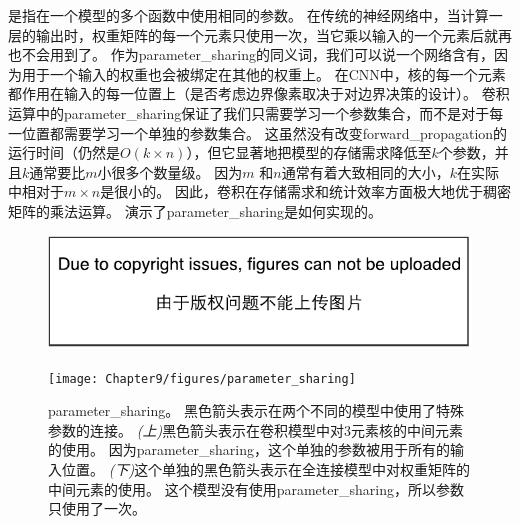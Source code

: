 是指在一个模型的多个函数中使用相同的参数。
在传统的神经网络中，当计算一层的输出时，权重矩阵的每一个元素只使用一次，当它乘以输入的一个元素后就再也不会用到了。
作为\gls{parameter_sharing}的同义词，我们可以说一个网络含有，因为用于一个输入的权重也会被绑定在其他的权重上。
在\gls{CNN}中，核的每一个元素都作用在输入的每一位置上（是否考虑边界像素取决于对边界决策的设计）。
卷积运算中的\gls{parameter_sharing}保证了我们只需要学习一个参数集合，而不是对于每一位置都需要学习一个单独的参数集合。
这虽然没有改变\gls{forward_propagation}的运行时间（仍然是$O(k\times n)$），但它显著地把模型的存储需求降低至$k$个参数，并且$k$通常要比$m$小很多个数量级。
因为$m$ 和$n$通常有着大致相同的大小，$k$在实际中相对于$m\times n$是很小的。
因此，卷积在存储需求和统计效率方面极大地优于稠密矩阵的乘法运算。
演示了\gls{parameter_sharing}是如何实现的。
\begin{figure}[!htb]
\ifOpenSource
\centerline{\includegraphics{figure.pdf}}
\else
\centerline{\texttt{[image: Chapter9/figures/parameter\_sharing]}}
\fi
\caption{\gls{parameter_sharing}。
黑色箭头表示在两个不同的模型中使用了特殊参数的连接。
\emph{(上)}黑色箭头表示在卷积模型中对3元素核的中间元素的使用。
因为\gls{parameter_sharing}，这个单独的参数被用于所有的输入位置。
\emph{(下)}这个单独的黑色箭头表示在全连接模型中对权重矩阵的中间元素的使用。
这个模型没有使用\gls{parameter_sharing}，所以参数只使用了一次。}
\label{fig:chap9_parameter_sharing}
\end{figure}
 
 
